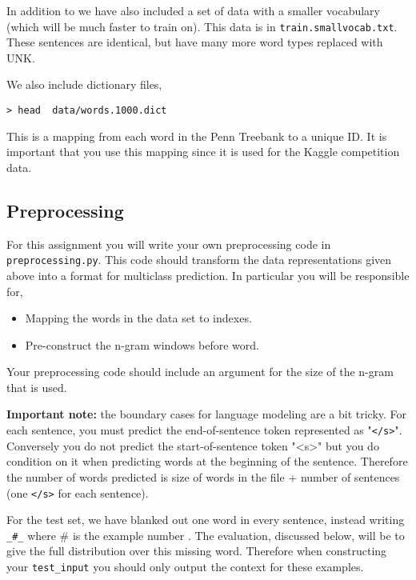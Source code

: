\documentclass[11pt]{article}
\begin{document}
In addition to we have also included a set of data with a smaller vocabulary (which 
will be much faster to train on). This data is in \texttt{train.smallvocab.txt}. 
These sentences are identical, but have many more word types replaced with UNK.

We also include dictionary files, 

\begin{verbatim}
> head  data/words.1000.dict 
\end{verbatim}

This is a mapping from each word in the Penn Treebank to
a unique ID. It is important that you use this mapping since it 
is used for the Kaggle competition data. 

\subsection{Preprocessing}

For this assignment you will write your own preprocessing code
in \texttt{preprocessing.py}. This code should transform the
data representations given above into a format for multiclass
prediction. In particular you will be responsible for,

\begin{itemize}
\item Mapping the words in the data set to indexes.
\item Pre-construct the n-gram windows before word.
\end{itemize}

Your preprocessing code should include an argument for the size of 
the n-gram that is used.

\textbf{Important note:} the boundary cases for language modeling are
a bit tricky. For each sentence, you must predict the end-of-sentence
token represented as "\texttt{</s>}". Conversely you do not predict the
start-of-sentence token "<s>" but you do condition on it when
predicting words at the beginning of the sentence. Therefore the
number of words predicted is size of words in the file + number of
sentences (one \texttt{</s>} for each sentence).


For the test set, we have blanked out one word in every sentence,
instead writing \texttt{\_\#\_} where \# is the example number .  The
evaluation, discussed below, will be to give the full distribution
over this missing word. Therefore when constructing your \texttt{test\_input}
you should only output the context for these examples.
\end{document}
